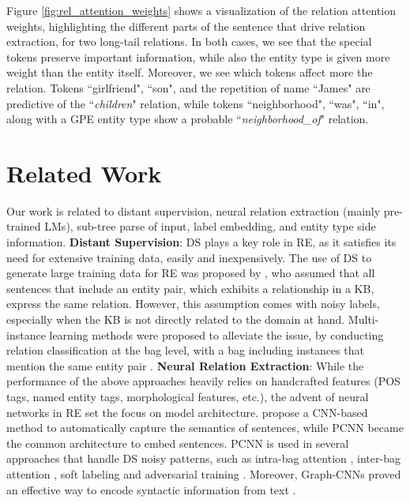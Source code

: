 \documentclass[11pt,a4paper]{article}
\begin{document}
Figure \ref{fig:rel_attention_weights} shows a visualization of the relation attention weights, highlighting the different parts of the sentence that drive relation extraction, for two long-tail relations. In both cases, we see that the special tokens preserve important information, while also the entity type is given more weight than the entity itself. Moreover, we see which tokens affect more the relation. Tokens ``girlfriend", ``son", and the repetition of name ``James" are predictive of the ``\textit{children}" relation, while tokens ``neighborhood", ``was", ``in", along with a GPE entity type show a probable ``\textit{neighborhood\_of}" relation. 


\section{Related Work}
\label{sect:relwork}
Our work is related to distant supervision, neural relation extraction (mainly pre-trained LMs), sub-tree parse of input, label embedding, and entity type side information.
\newline
\textbf{Distant Supervision}:
DS plays a key role in RE, as it satisfies its need for extensive training data, easily and inexpensively. The use of DS \cite{Craven1999, Snow2005} to generate large training data for RE was proposed by \cite{Mintz2009}, who assumed that all sentences that include an entity pair, which exhibits a relationship in a KB, express the same relation. However, this assumption comes with noisy labels, especially when the KB is not directly related to the domain at hand. Multi-instance learning methods were proposed to alleviate the issue, by conducting relation classification at the bag level, with a bag including instances that mention the same entity pair \cite{Riedel2010, Hoffmann_2011}. 
\newline
\textbf{Neural Relation Extraction}:
While the performance of the above approaches heavily relies on handcrafted features (POS tags, named entity tags, morphological features, etc.), the advent of neural networks in RE set the focus on model architecture. 
 propose a CNN-based method to automatically capture the semantics of sentences, while PCNN \cite{Zeng2015} became the common architecture to embed sentences. PCNN is used in several approaches that handle DS noisy patterns, such as intra-bag attention \cite{Lin2016}, inter-bag attention \cite{Ye2019}, soft labeling \cite{Liu2017a, Wang2018} and adversarial training \cite{Wu2018,qin2018dsgan}. Moreover, Graph-CNNs proved an effective way to encode syntactic information from text \cite{Vashishth2018}.
\end{document}
